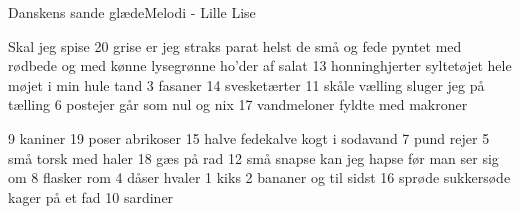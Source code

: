 \begin{sang}{Danskens sande glæde}{Melodi - Lille Lise}
\begin{vers}
Skal jeg spise
20 grise
er jeg straks parat
helst de små og fede
pyntet med rødbede
og med kønne
lysegrønne
ho'der af salat
13 honninghjerter
syltetøjet
hele møjet
i min hule tand
3 fasaner
14 svesketærter
11 skåle vælling
sluger jeg på  tælling
6 postejer
går som nul og nix
17 vandmeloner
fyldte med makroner
\end{vers}
\vbox{}\vfill
\begin{vers}
9 kaniner
19 poser
abrikoser
15 halve
fedekalve
kogt i sodavand
7 pund rejer
5 små torsk med haler
18 gæs på rad
12 små snapse
kan jeg hapse
før man ser sig om
8 flasker rom
4 dåser hvaler
1 kiks
2 bananer
og til sidst
16 sprøde
sukkersøde
kager på et fad
10 sardiner
\end{vers}
\laps
\end{sang}